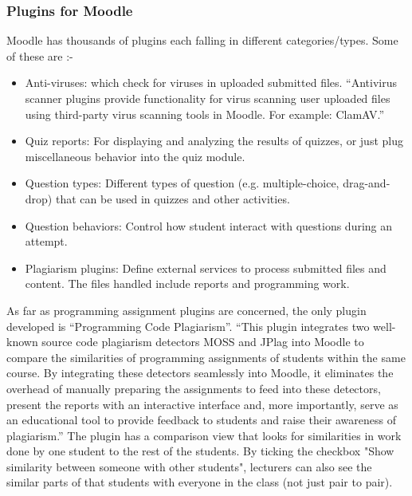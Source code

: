 \documentclass[12pt]{article}
\begin{document}
		 \subsubsection{Plugins for Moodle}
		 Moodle has thousands of plugins each falling in different categories/types. Some of these are :- 
		 \begin{itemize}
			\item Anti-viruses: which check for viruses in uploaded submitted files. “Antivirus scanner plugins provide 						functionality for virus scanning user uploaded files using third-party virus scanning tools in Moodle. For 				example: ClamAV.” 
			\item  Quiz reports: For displaying and analyzing the results of quizzes, or just plug miscellaneous behavior 					into the quiz module.
			\item Question types: Different types of question (e.g. multiple-choice, drag-and-drop) that can be used in 					quizzes and other activities.
			\item Question behaviors: Control how student interact with questions during an attempt.
			\item Plagiarism plugins: Define external services to process submitted files and content. The files handled 						include reports and programming work.
		\end{itemize}
		As far as programming assignment plugins are concerned, the only plugin developed is “Programming Code 				Plagiarism”. “This plugin integrates two well-known source code plagiarism detectors MOSS and JPlag into Moodle to 			compare the similarities of programming assignments of students within the same course. By integrating these 				detectors seamlessly into Moodle, it eliminates the overhead of manually preparing the assignments to feed into 				these detectors, present the reports with an interactive interface and, more importantly, serve as an educational 			tool to provide feedback to students and raise their awareness of plagiarism.” The plugin has a comparison view 			that looks for similarities in work done by one student to the rest of the students. By ticking the checkbox "Show 				similarity between someone with other students", lecturers can also see the similar parts of that students with 			everyone in the class (not just pair to pair).
\end{document}
